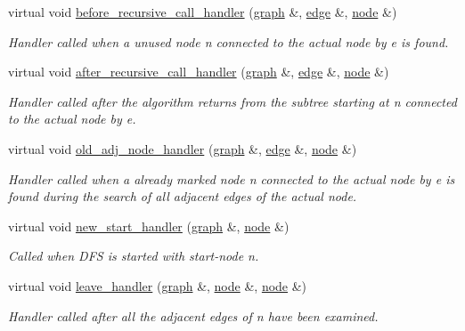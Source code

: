 \begin{DoxyCompactItemize}
virtual void \mbox{\hyperlink{classbiconnectivity_a19261e91eef3f7d6b8586fa1eae9f277}{before\+\_\+recursive\+\_\+call\+\_\+handler}} (\mbox{\hyperlink{classgraph}{graph}} \&, \mbox{\hyperlink{classedge}{edge}} \&, \mbox{\hyperlink{classnode}{node}} \&)
\begin{DoxyCompactList}\small\item\em Handler called when a unused node {\itshape n} connected to the actual node by {\itshape e} is found. \end{DoxyCompactList}\item 
virtual void \mbox{\hyperlink{classbiconnectivity_a69ca91409485b57c486b188596080d7a}{after\+\_\+recursive\+\_\+call\+\_\+handler}} (\mbox{\hyperlink{classgraph}{graph}} \&, \mbox{\hyperlink{classedge}{edge}} \&, \mbox{\hyperlink{classnode}{node}} \&)
\begin{DoxyCompactList}\small\item\em Handler called after the algorithm returns from the subtree starting at {\itshape n} connected to the actual node by {\itshape e}. \end{DoxyCompactList}\item 
virtual void \mbox{\hyperlink{classbiconnectivity_a92228b87472140374dffea7d9f7ee20d}{old\+\_\+adj\+\_\+node\+\_\+handler}} (\mbox{\hyperlink{classgraph}{graph}} \&, \mbox{\hyperlink{classedge}{edge}} \&, \mbox{\hyperlink{classnode}{node}} \&)
\begin{DoxyCompactList}\small\item\em Handler called when a already marked node {\itshape n} connected to the actual node by {\itshape e} is found during the search of all adjacent edges of the actual node. \end{DoxyCompactList}\item 
virtual void \mbox{\hyperlink{classbiconnectivity_ae94213830755f1f4d477ec6bff0f25b8}{new\+\_\+start\+\_\+handler}} (\mbox{\hyperlink{classgraph}{graph}} \&, \mbox{\hyperlink{classnode}{node}} \&)
\begin{DoxyCompactList}\small\item\em Called when D\+FS is started with start-\/node {\itshape n}. \end{DoxyCompactList}\item 
virtual void \mbox{\hyperlink{classbiconnectivity_a868587fdc4dbb3bf80899d1c7d49b558}{leave\+\_\+handler}} (\mbox{\hyperlink{classgraph}{graph}} \&, \mbox{\hyperlink{classnode}{node}} \&, \mbox{\hyperlink{classnode}{node}} \&)
\begin{DoxyCompactList}\small\item\em Handler called after all the adjacent edges of {\itshape n} have been examined. \end{DoxyCompactList}\item 

\end{DoxyCompactItemize}
